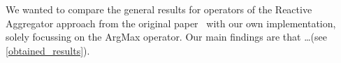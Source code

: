 We wanted to compare the general results for operators of the Reactive Aggregator approach from the original paper~\cite{GeneralIncremental15}
with our own implementation, solely focussing on the ArgMax operator. Our main findings are that \ldots (see \autoref{obtained_results}).